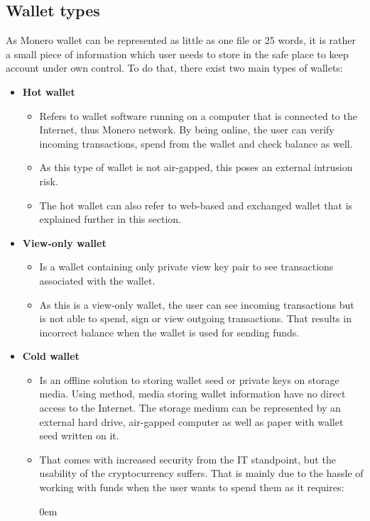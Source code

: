 \documentclass[
  printed, %
  table,   %
  nolof,     %
  nolot,     %
           oneside, color
]{fithesis3}
\begin{document}
\subsection{Wallet types}
\label{sec:wallettypes}
As Monero wallet can be represented as little as one file or 25 words, it is rather a small piece of information which user needs to store in the safe place to keep account under own control. To do that, there exist two main types of wallets:
\begin{itemize}\itemsep0em
\item \textbf{Hot wallet}
\begin{itemize}\itemsep0em
\item Refers to wallet software running on a computer that is connected to the Internet, thus Monero network. By being online, the user can verify incoming transactions, spend from the wallet and check balance as well.
\item As this type of wallet is not air-gapped, this poses an external intrusion risk.
\item The hot wallet can also refer to web-based and exchanged wallet that is explained further in this section.
\end{itemize}
\item \textbf{View-only wallet}
\begin{itemize}\itemsep0em
\item Is a wallet containing only private view key pair to see transactions associated with the wallet.
\item As this is a view-only wallet, the user can see incoming transactions but is not able to spend, sign or view outgoing transactions. That results in incorrect balance when the wallet is used for sending funds.
\end{itemize}
\item \textbf{Cold wallet}
\begin{itemize}\itemsep0em
\item Is an offline solution to storing wallet seed or private keys on storage media. Using method, media storing wallet information have no direct access to the Internet. The storage medium can be represented by an external hard drive, air-gapped computer as well as paper with wallet seed written on it.
\item That comes with increased security from the IT standpoint, but the usability of the cryptocurrency suffers. That is mainly due to the hassle of working with funds when the user wants to spend them as it requires:
\begin{itemize}\itemsep0em

\end{itemize}
\end{itemize}
\end{itemize}
\end{document}
